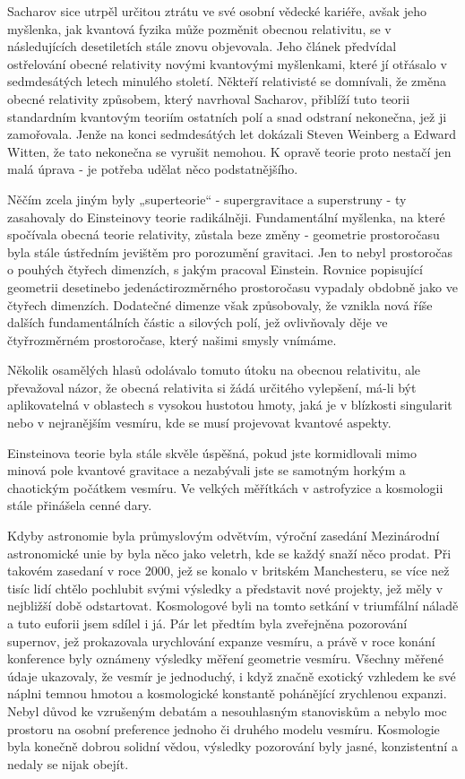   Sacharov sice utrpěl určitou ztrátu ve své osobní vědecké kariéře, avšak jeho myšlenka, jak
  kvantová fyzika může pozměnit obecnou relativitu, se v následujících desetiletích stále znovu
  objevovala. Jeho článek předvídal ostřelování obecné relativity novými kvantovými myšlenkami,
  které jí otřásalo v sedmdesátých letech minulého století. Někteří relativisté se domnívali, že
  změna obecné relativity způsobem, který navrhoval Sacharov, přiblíží tuto teorii standardním
  kvantovým teoriím ostatních polí a snad odstraní nekonečna, jež ji zamořovala. Jenže na konci
  sedmdesátých let dokázali Steven Weinberg a Edward Witten, že tato nekonečna se vyrušit nemohou. K
  opravě teorie proto nestačí jen malá úprava - je potřeba udělat něco podstatnějšího. 
  
  Něčím zcela jiným byly „superteorie“ - supergravitace a superstruny - ty zasahovaly do Einsteinovy
  teorie radikálněji. Fundamentální myšlenka, na které spočívala obecná teorie relativity, zůstala
  beze změny - geometrie prostoročasu byla stále ústředním jevištěm pro porozumění gravitaci. Jen to
  nebyl prostoročas o pouhých čtyřech dimenzích, s jakým pracoval Einstein. Rovnice popisující
  geometrii desetinebo jedenáctirozměrného prostoročasu vypadaly obdobně jako ve čtyřech dimenzích.
  Dodatečné dimenze však způsobovaly, že vznikla nová říše dalších fundamentálních částic a silových
  polí, jež ovlivňovaly děje ve čtyřrozměrném prostoročase, který našimi smysly vnímáme. 
  
  Několik osamělých hlasů odolávalo tomuto útoku na obecnou relativitu, ale převažoval názor, že
  obecná relativita si žádá určitého vylepšení, má-li být aplikovatelná v oblastech s vysokou
  hustotou hmoty, jaká je v blízkosti singularit nebo v nejranějším vesmíru, kde se musí projevovat
  kvantové aspekty. 
  
  Einsteinova teorie byla stále skvěle úspěšná, pokud jste kormidlovali mimo minová pole kvantové
  gravitace a nezabývali jste se samotným horkým a chaotickým počátkem vesmíru. Ve velkých měřítkách
  v astrofyzice a kosmologii stále přinášela cenné dary. 
  
  Kdyby astronomie byla průmyslovým odvětvím, výroční zasedání Mezinárodní astronomické unie by byla
  něco jako veletrh, kde se každý snaží něco prodat. Při takovém zasedaní v roce 2000, jež se konalo
  v britském Manchesteru, se více než tisíc lidí chtělo pochlubit svými výsledky a představit nové
  projekty, jež měly v nejbližší době odstartovat. Kosmologové byli na tomto setkání v triumfální
  náladě a tuto euforii jsem sdílel i já. Pár let předtím byla zveřejněna pozorování supernov, jež
  prokazovala urychlování expanze vesmíru, a právě v roce konání konference byly oznámeny výsledky
  měření geometrie vesmíru. Všechny měřené údaje ukazovaly, že vesmír je jednoduchý, i když značně
  exotický vzhledem ke své náplni temnou hmotou a kosmologické konstantě pohánějící zrychlenou
  expanzi. Nebyl důvod ke vzrušeným debatám a nesouhlasným stanoviskům a nebylo moc prostoru na
  osobní preference jednoho či druhého modelu vesmíru. Kosmologie byla konečně dobrou solidní vědou,
  výsledky pozorování byly jasné, konzistentní a nedaly se nijak obejít. 
  
